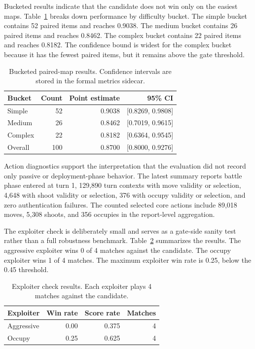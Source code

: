 \documentclass{article}
\begin{document}
Bucketed results indicate that the candidate does not win only on the easiest maps. Table~\ref{tab:bucket-results} breaks down performance by difficulty bucket. The simple bucket contains 52 paired items and reaches 0.9038. The medium bucket contains 26 paired items and reaches 0.8462. The complex bucket contains 22 paired items and reaches 0.8182. The confidence bound is widest for the complex bucket because it has the fewest paired items, but it remains above the gate threshold.

\begin{table}[t]
  \centering
  \caption{Bucketed paired-map results. Confidence intervals are stored in the formal metrics sidecar.}
  \label{tab:bucket-results}
  \begin{tabular}{lrrr}
    \toprule
    Bucket & Count & Point estimate & 95\% CI \\
    \midrule
    Simple & 52 & 0.9038 & [0.8269, 0.9808] \\
    Medium & 26 & 0.8462 & [0.7019, 0.9615] \\
    Complex & 22 & 0.8182 & [0.6364, 0.9545] \\
    Overall & 100 & 0.8700 & [0.8000, 0.9276] \\
    \bottomrule
  \end{tabular}
\end{table}

Action diagnostics support the interpretation that the evaluation did not record only passive or deployment-phase behavior. The latest summary reports battle phase entered at turn 1, 129,890 turn contexts with move validity or selection, 4,648 with shoot validity or selection, 376 with occupy validity or selection, and zero authentication failures. The counted selected core actions include 89,018 moves, 5,308 shoots, and 356 occupies in the report-level aggregation.

The exploiter check is deliberately small and serves as a gate-side sanity test rather than a full robustness benchmark. Table~\ref{tab:exploiter} summarizes the results. The aggressive exploiter wins 0 of 4 matches against the candidate. The occupy exploiter wins 1 of 4 matches. The maximum exploiter win rate is 0.25, below the 0.45 threshold.

\begin{table}[t]
  \centering
  \caption{Exploiter check results. Each exploiter plays 4 matches against the candidate.}
  \label{tab:exploiter}
  \begin{tabular}{lrrr}
    \toprule
    Exploiter & Win rate & Score rate & Matches \\
    \midrule
    Aggressive & 0.00 & 0.375 & 4 \\
    Occupy & 0.25 & 0.625 & 4 \\
    \bottomrule
  \end{tabular}
\end{table}
\end{document}

